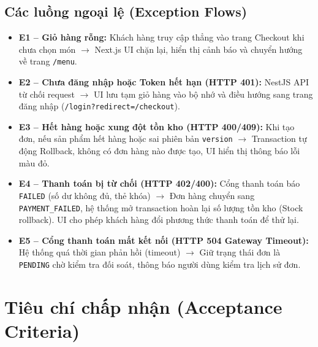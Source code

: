 \documentclass[12pt,a4paper]{article}
\begin{document}
\subsection{Các luồng ngoại lệ (Exception Flows)}
\begin{itemize}[leftmargin=*,itemsep=3pt]
    \item \textbf{E1 -- Giỏ hàng rỗng:} Khách hàng truy cập thẳng vào trang Checkout khi chưa chọn món $\rightarrow$ Next.js UI chặn lại, hiển thị cảnh báo và chuyển hướng về trang \texttt{/menu}.
    \item \textbf{E2 -- Chưa đăng nhập hoặc Token hết hạn (HTTP 401):} NestJS API từ chối request $\rightarrow$ UI lưu tạm giỏ hàng vào bộ nhớ và điều hướng sang trang đăng nhập (\texttt{/login?redirect=/checkout}).
    \item \textbf{E3 -- Hết hàng hoặc xung đột tồn kho (HTTP 400/409):} Khi tạo đơn, nếu sản phẩm hết hàng hoặc sai phiên bản \texttt{version} $\rightarrow$ Transaction tự động Rollback, không có đơn hàng nào được tạo, UI hiển thị thông báo lỗi màu đỏ.
    \item \textbf{E4 -- Thanh toán bị từ chối (HTTP 402/400):} Cổng thanh toán báo \texttt{FAILED} (số dư không đủ, thẻ khóa) $\rightarrow$ Đơn hàng chuyển sang \texttt{PAYMENT\_FAILED}, hệ thống mở transaction hoàn lại số lượng tồn kho (Stock rollback). UI cho phép khách hàng đổi phương thức thanh toán để thử lại.
    \item \textbf{E5 -- Cổng thanh toán mất kết nối (HTTP 504 Gateway Timeout):} Hệ thống quá thời gian phản hồi (timeout) $\rightarrow$ Giữ trạng thái đơn là \texttt{PENDING} chờ kiểm tra đối soát, thông báo người dùng kiểm tra lịch sử đơn.
\end{itemize}

\section{Tiêu chí chấp nhận (Acceptance Criteria)}
\end{document}
